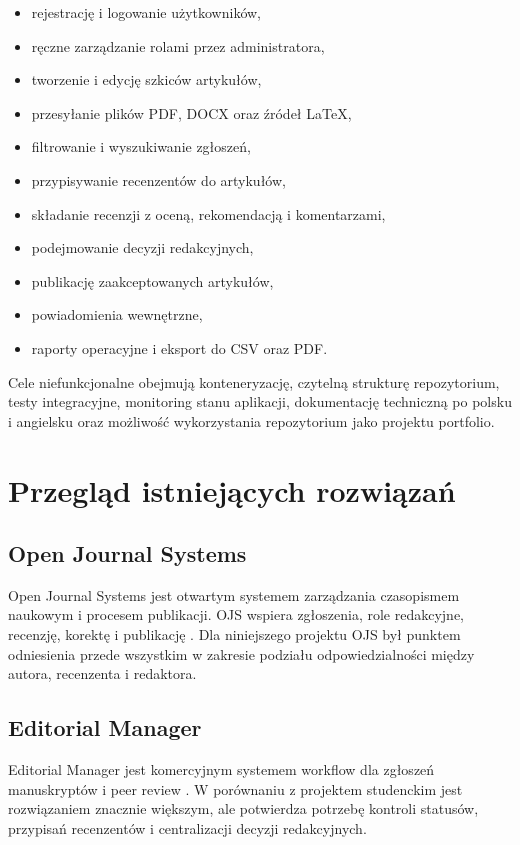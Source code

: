 \documentclass[times]{san}
\begin{document}
\begin{itemize}
    \item rejestrację i logowanie użytkowników,
    \item ręczne zarządzanie rolami przez administratora,
    \item tworzenie i edycję szkiców artykułów,
    \item przesyłanie plików PDF, DOCX oraz źródeł LaTeX,
    \item filtrowanie i wyszukiwanie zgłoszeń,
    \item przypisywanie recenzentów do artykułów,
    \item składanie recenzji z oceną, rekomendacją i komentarzami,
    \item podejmowanie decyzji redakcyjnych,
    \item publikację zaakceptowanych artykułów,
    \item powiadomienia wewnętrzne,
    \item raporty operacyjne i eksport do CSV oraz PDF.
\end{itemize}

Cele niefunkcjonalne obejmują konteneryzację, czytelną strukturę repozytorium, testy integracyjne, monitoring stanu aplikacji, dokumentację techniczną po polsku i angielsku oraz możliwość wykorzystania repozytorium jako projektu portfolio.

\section{Przegląd istniejących rozwiązań}

\subsection{Open Journal Systems}

Open Journal Systems jest otwartym systemem zarządzania czasopismem naukowym i procesem publikacji. OJS wspiera zgłoszenia, role redakcyjne, recenzję, korektę i publikację \cite{ojs_workflow}. Dla niniejszego projektu OJS był punktem odniesienia przede wszystkim w zakresie podziału odpowiedzialności między autora, recenzenta i redaktora.

\subsection{Editorial Manager}

Editorial Manager jest komercyjnym systemem workflow dla zgłoszeń manuskryptów i peer review \cite{aries_editorial_manager}. W porównaniu z projektem studenckim jest rozwiązaniem znacznie większym, ale potwierdza potrzebę kontroli statusów, przypisań recenzentów i centralizacji decyzji redakcyjnych.
\end{document}
